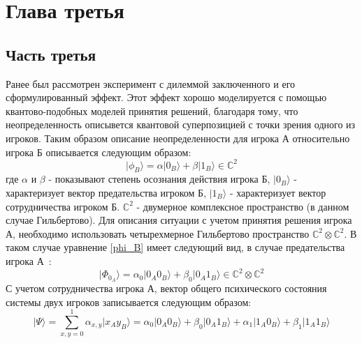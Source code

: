 \chapter{Глава третья}
\section{Часть третья}

Ранее был рассмотрен эксперимент с дилеммой заключенного и его сформулированный эффект.
Этот эффект хорошо моделируется с помощью квантово-подобных моделей принятия решений, благодаря
тому, что неопределенность описывется квантовой суперпозицией с точки зрения одного из игроков.
Таким образом описание неопределенности для игрока А относительно игрока Б описывается следующим образом:
\begin{equation}\label{phi_B}
    \vert \phi_{B} \rangle = \alpha \vert 0_{B} \rangle + \beta \vert 1_{B} \rangle \in \mathbb{C}^{2} %
\end{equation}
где $\alpha$ и $\beta$ - показывают степень осознания действия игрока Б, $\vert 0_{B} \rangle$ - характеризует
вектор предательства игроком Б, $\vert 1_{B} \rangle$ - характеризует вектор сотрудничества игроком Б.
$\mathbb{C}^{2}$ - двумерное комплексное пространство (в данном случае Гильбертово).
Для описания ситуации с учетом принятия решения игрока А, необходимо использовать четырехмерное Гильбертово
пространство $\mathbb{C}^{2} \otimes \mathbb{C}^{2}$.
В таком случае уравнение \eqref{phi_B} имеет следующий вид, в случае предательства игрока А~\citep{asano2011quantum}:
\begin{equation}
    \vert \Phi_{0_{A}} \rangle = \alpha_{0} \vert 0_{A} 0_{B} \rangle + \beta_{0} \vert 0_{A} 1_{B} \rangle \in \mathbb{C}^{2} \otimes \mathbb{C}^{2}
\end{equation}
С учетом сотрудничества игрока А, вектор общего психического состояния системы двух игроков записывается
следующим образом:
\begin{equation}
    \vert \Psi \rangle = \sum_{x,y=0}^{1} \alpha_{x,y} \vert x_{A} y_{B} \rangle =
    \alpha_{0} \vert 0_{A} 0_{B} \rangle + \beta_{0} \vert 0_{A} 1_{B} \rangle +
    \alpha_{1} \vert 1_{A} 0_{B} \rangle + \beta_{1} \vert 1_{A} 1_{B} \rangle
\end{equation}

